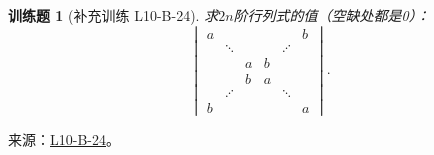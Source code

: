 \documentclass[UTF8,12pt,a4paper,fontset=fandol]{ctexart}
\newtheorem{exercise}{训练题}[section]
\begin{document}
\begin{exercise}[补充训练 L10-B-24]\label{prob:L10-B-24}
求$2n$阶行列式的值（空缺处都是0）：
        \[\begin{vmatrix}
                a &         &   &   &         & b \\
                  & \ddots  &   &   & \iddots &   \\
                  &         & a & b &         &   \\
                  &         & b & a &         &   \\
                  & \iddots &   &   & \ddots  &   \\
                b &         &   &   &         & a
            \end{vmatrix}.\]
\end{exercise}
\noindent 来源：\href{https://github.com/yhwu-is/Linear-Algebra-Left-Undone/blob/new/%E8%AE%B2%E4%B9%89/%E4%B8%93%E9%A2%98/10%20%E8%A1%8C%E5%88%97%E5%BC%8F.tex}{L10-B-24}。
\end{document}
